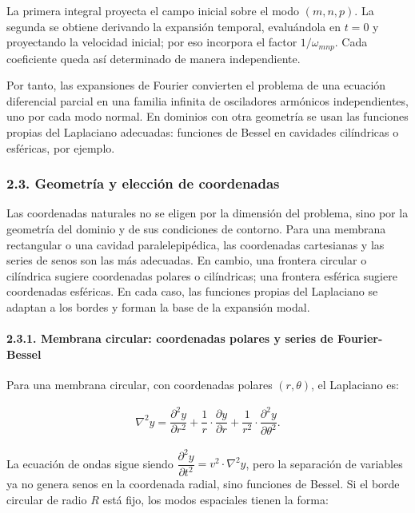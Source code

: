 \documentclass[
  spanish,
]{article}
\begin{document}
La primera integral proyecta el campo inicial sobre el modo \((m,n,p)\).
La segunda se obtiene derivando la expansión temporal, evaluándola en
\(t=0\) y proyectando la velocidad inicial; por eso incorpora el factor
\(1/\omega_{mnp}\). Cada coeficiente queda así determinado de manera
independiente.

Por tanto, las expansiones de Fourier convierten el problema de una
ecuación diferencial parcial en una familia infinita de osciladores
armónicos independientes, uno por cada modo normal. En dominios con otra
geometría se usan las funciones propias del Laplaciano adecuadas:
funciones de Bessel en cavidades cilíndricas o esféricas, por ejemplo.

\subsubsection{2.3. Geometría y elección de
coordenadas}\label{geometruxeda-y-elecciuxf3n-de-coordenadas}

Las coordenadas naturales no se eligen por la dimensión del problema,
sino por la geometría del dominio y de sus condiciones de contorno. Para
una membrana rectangular o una cavidad paralelepipédica, las coordenadas
cartesianas y las series de senos son las más adecuadas. En cambio, una
frontera circular o cilíndrica sugiere coordenadas polares o
cilíndricas; una frontera esférica sugiere coordenadas esféricas. En
cada caso, las funciones propias del Laplaciano se adaptan a los bordes
y forman la base de la expansión modal.

\paragraph{2.3.1. Membrana circular: coordenadas polares y series de
Fourier-Bessel}\label{membrana-circular-coordenadas-polares-y-series-de-fourier-bessel}

Para una membrana circular, con coordenadas polares \((r,\theta)\), el
Laplaciano es:

\[
\begin{aligned}
\nabla^2 y
= \dfrac{\partial^2 y}{\partial r^2}
+ \dfrac{1}{r} \cdot \dfrac{\partial y}{\partial r}
+ \dfrac{1}{r^2} \cdot \dfrac{\partial^2 y}{\partial \theta^2}.
\end{aligned}
\]

La ecuación de ondas sigue siendo
\(\dfrac{\partial^2 y}{\partial t^2}=v^2 \cdot \nabla^2y\), pero la
separación de variables ya no genera senos en la coordenada radial, sino
funciones de Bessel. Si el borde circular de radio \(R\) está fijo, los
modos espaciales tienen la forma:
\end{document}
